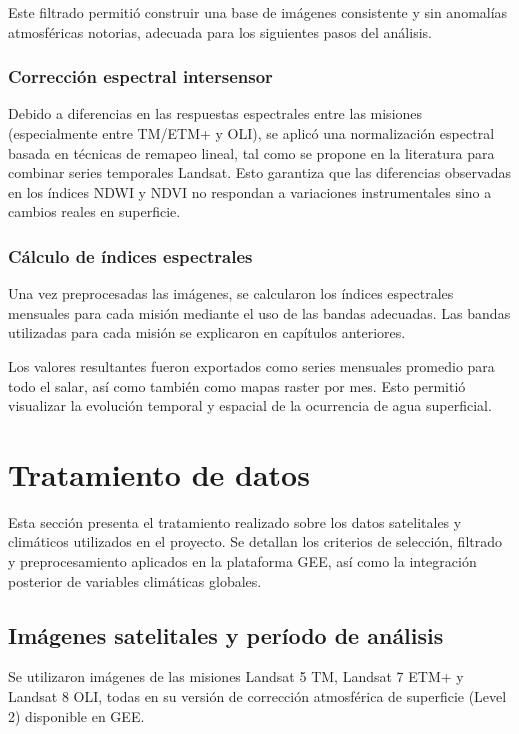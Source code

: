 Este filtrado permitió construir una base de imágenes consistente y sin anomalías atmosféricas notorias, adecuada para los siguientes pasos del análisis.



\subsubsection*{Corrección espectral intersensor}

Debido a diferencias en las respuestas espectrales entre las misiones (especialmente entre TM/ETM+ y OLI), se aplicó una normalización espectral basada en técnicas de remapeo lineal, tal como se propone en la literatura para combinar series temporales Landsat. Esto garantiza que las diferencias observadas en los índices NDWI y NDVI no respondan a variaciones instrumentales sino a cambios reales en superficie.

\subsubsection*{Cálculo de índices espectrales}

Una vez preprocesadas las imágenes, se calcularon los índices espectrales mensuales para cada misión mediante el uso de las bandas adecuadas. Las bandas utilizadas para cada misión se explicaron en capítulos anteriores.

Los valores resultantes fueron exportados como series mensuales promedio para todo el salar, así como también como mapas raster por mes. Esto permitió visualizar la evolución temporal y espacial de la ocurrencia de agua superficial.

\section{Tratamiento de datos }

Esta sección presenta el tratamiento realizado sobre los datos satelitales y climáticos utilizados en el proyecto. Se detallan los criterios de selección, filtrado y preprocesamiento aplicados en la plataforma GEE, así como la integración posterior de variables climáticas globales.

\subsection*{Imágenes satelitales y período de análisis}

Se utilizaron imágenes de las misiones Landsat 5 TM, Landsat 7 ETM+ y Landsat 8 OLI, todas en su versión de corrección atmosférica de superficie (Level 2) disponible en GEE.

